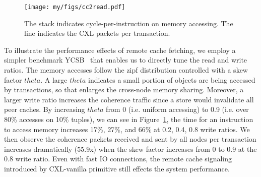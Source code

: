 \ifx\undefined\stale

\begin{figure}[t]
  \texttt{[image: my/figs/cc2read.pdf]}
  \caption{The stack indicates cycle-per-instruction on memory accessing. The line indicates the CXL packets per transaction. }
  \label{fig:cc2read}
\end{figure}


To illustrate the performance effects of remote cache fetching, we employ a simpler benchmark YCSB~\cite{ycsb} that enables us to directly tune the read and write ratios. The memory accesses follow the zipf distribution controlled with a skew factor $theta$. A large $theta$ indicates a small portion of objects are being accessed by transactions, so that enlarges the cross-node memory sharing. Moreover, a larger write ratio increases the coherence traffic since a store would invalidate all peer caches. By increasing $theta$ from 0 (i.e. uniform accessing) to 0.9 (i.e. over 80\% accesses on 10\% tuples), we can see in Figure~\ref{fig:cc2read}, the time for an instruction to access memory increases 17\%, 27\%, and 66\% at 0.2, 0.4, 0.8 write ratios. 
We then observe the coherence packets received and sent by all nodes per transaction increases dramatically (55.9x) when the skew factor increases from 0 to 0.9 at the 0.8 write ratio. 
Even with fast IO connections, the remote cache signaling introduced by CXL-vanilla primitive still effects the system performance. 
\fi




